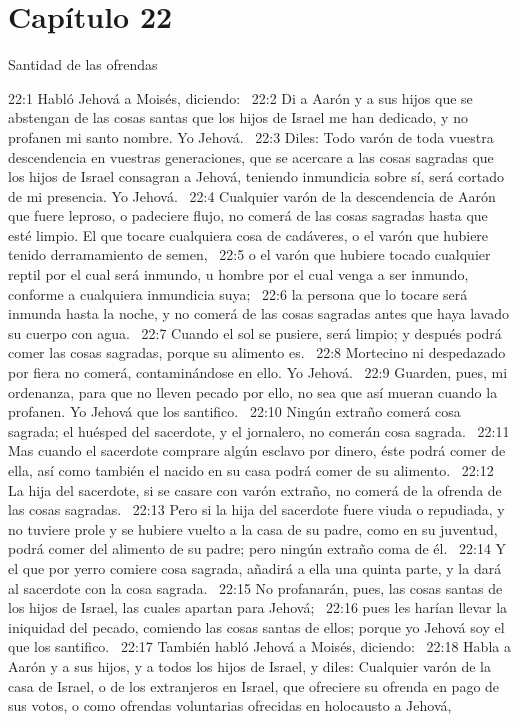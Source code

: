 \section*{Capítulo 22}
Santidad de las ofrendas  

22:1 Habló Jehová a Moisés, diciendo:  
22:2 Di a Aarón y a sus hijos que se abstengan de las cosas santas que los hijos de Israel me han dedicado, y no profanen mi santo nombre. Yo Jehová.  
22:3 Diles: Todo varón de toda vuestra descendencia en vuestras generaciones, que se acercare a las cosas sagradas que los hijos de Israel consagran a Jehová, teniendo inmundicia sobre sí, será cortado de mi presencia. Yo Jehová.  
22:4 Cualquier varón de la descendencia de Aarón que fuere leproso, o padeciere flujo, no comerá de las cosas sagradas hasta que esté limpio. El que tocare cualquiera cosa de cadáveres, o el varón que hubiere tenido derramamiento de semen,  
22:5 o el varón que hubiere tocado cualquier reptil por el cual será inmundo, u hombre por el cual venga a ser inmundo, conforme a cualquiera inmundicia suya;  
22:6 la persona que lo tocare será inmunda hasta la noche, y no comerá de las cosas sagradas antes que haya lavado su cuerpo con agua.  
22:7 Cuando el sol se pusiere, será limpio; y después podrá comer las cosas sagradas, porque su alimento es.  
22:8 Mortecino ni despedazado por fiera no comerá, contaminándose en ello. Yo Jehová.  
22:9 Guarden, pues, mi ordenanza, para que no lleven pecado por ello, no sea que así mueran cuando la profanen. Yo Jehová que los santifico.  
22:10 Ningún extraño comerá cosa sagrada; el huésped del sacerdote, y el jornalero, no comerán cosa sagrada.  
22:11 Mas cuando el sacerdote comprare algún esclavo por dinero, éste podrá comer de ella, así como también el nacido en su casa podrá comer de su alimento.  
22:12 La hija del sacerdote, si se casare con varón extraño, no comerá de la ofrenda de las cosas sagradas.  
22:13 Pero si la hija del sacerdote fuere viuda o repudiada, y no tuviere prole y se hubiere vuelto a la casa de su padre, como en su juventud, podrá comer del alimento de su padre; pero ningún extraño coma de él.  
22:14 Y el que por yerro comiere cosa sagrada, añadirá a ella una quinta parte, y la dará al sacerdote con la cosa sagrada.  
22:15 No profanarán, pues, las cosas santas de los hijos de Israel, las cuales apartan para Jehová;  
22:16 pues les harían llevar la iniquidad del pecado, comiendo las cosas santas de ellos; porque yo Jehová soy el que los santifico.  
22:17 También habló Jehová a Moisés, diciendo:  
22:18 Habla a Aarón y a sus hijos, y a todos los hijos de Israel, y diles: Cualquier varón de la casa de Israel, o de los extranjeros en Israel, que ofreciere su ofrenda en pago de sus votos, o como ofrendas voluntarias ofrecidas en holocausto a Jehová,  

